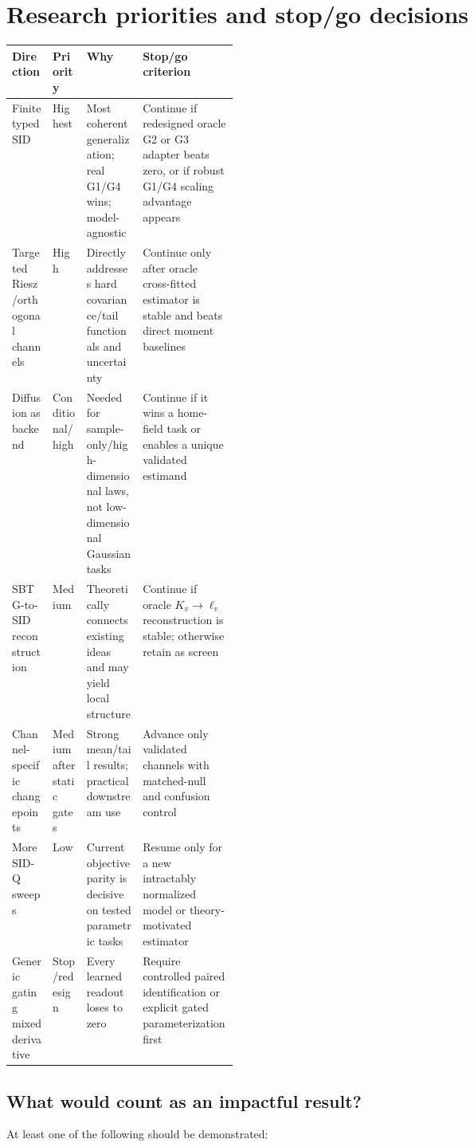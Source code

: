 \documentclass[10pt]{article}
\newcommand{\SIDQ}{\textnormal{\textsc{SID-Q}}\xspace}
\begin{document}
\section{Research priorities and stop/go decisions}

\begin{center}
\begin{tabularx}{\linewidth}{@{}p{0.18\linewidth}p{0.15\linewidth}X X@{}}
\toprule
Direction & Priority & Why & Stop/go criterion \\
\midrule
Finite typed SID & Highest & Most coherent generalization; real G1/G4 wins; model-agnostic & Continue if redesigned oracle G2 or G3 adapter beats zero, or if robust G1/G4 scaling advantage appears \\
Targeted Riesz/orthogonal channels & High & Directly addresses hard covariance/tail functionals and uncertainty & Continue only after oracle cross-fitted estimator is stable and beats direct moment baselines \\
Diffusion as backend & Conditional/high & Needed for sample-only/high-dimensional laws, not low-dimensional Gaussian tasks & Continue if it wins a home-field task or enables a unique validated estimand \\
SBTG-to-SID reconstruction & Medium & Theoretically connects existing ideas and may yield local structure & Continue if oracle \(K_v\to\ell_v\) reconstruction is stable; otherwise retain as screen \\
Channel-specific changepoints & Medium after static gates & Strong mean/tail results; practical downstream use & Advance only validated channels with matched-null and confusion control \\
More \SIDQ sweeps & Low & Current objective parity is decisive on tested parametric tasks & Resume only for a new intractably normalized model or theory-motivated estimator \\
Generic gating mixed derivative & Stop/redesign & Every learned readout loses to zero & Require controlled paired identification or explicit gated parameterization first \\
\bottomrule
\end{tabularx}
\end{center}

\subsection{What would count as an impactful result?}

At least one of the following should be demonstrated:
\end{document}
